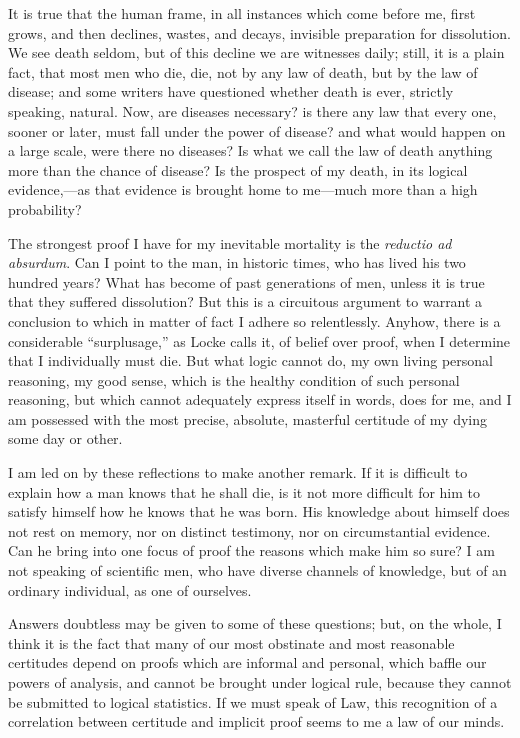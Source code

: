 It is true that the human frame, in all instances which come before
me, first grows, and then declines, wastes, and decays, invisible
preparation for dissolution. We see death seldom, but of this decline
we are witnesses daily; still, it is a plain fact, that most men who
die, die, not by any law of death, but by the law of disease; and some
writers have questioned whether death is ever, strictly speaking,
natural. Now, are diseases necessary? is there any law that every one,
sooner or later, must fall under the power of disease? and what would
happen on a large scale, were there no diseases? Is what we call the
law of death anything more than the chance of disease? Is the prospect
of my death, in its logical evidence,—as that evidence is brought
home to me—much more than a high probability?

The strongest proof I have for my inevitable mortality is the \emph{reductio
ad absurdum}. Can I point to the man, in historic times, who has
lived his two hundred years? What has become of past generations of
men, unless it is true that they suffered dissolution? But this is a
circuitous argument to warrant a conclusion to which in matter of fact
I adhere so relentlessly. Anyhow, there is a considerable ``surplusage,''
as Locke calls it, of belief over proof, when I determine that I
individually must die. But what logic cannot do, my own living
personal reasoning, my good sense, which is the healthy condition of
such personal reasoning, but which cannot adequately express itself in
words, does for me, and I am possessed with the most precise,
absolute, masterful certitude of my dying some day or other.

I am led on by these reflections to make another remark. If it is
difficult to explain how a man knows that he shall die, is it not more
difficult for him to satisfy himself how he knows that he was born.
His knowledge about himself does not rest on memory, nor on distinct
testimony, nor on circumstantial evidence. Can he bring into one focus
of proof the reasons which make him so sure? I am not speaking of
scientific men, who have diverse channels of knowledge, but of an
ordinary individual, as one of ourselves.

Answers doubtless may be given to some of these questions; but, on
the whole, I think it is the fact that many of our most obstinate and
most reasonable certitudes depend on proofs which are informal and
personal, which baffle our powers of analysis, and cannot be brought
under logical rule, because they cannot be submitted to logical
statistics. If we must speak of Law, this recognition of a correlation
between certitude and implicit proof seems to me a law of our minds.


